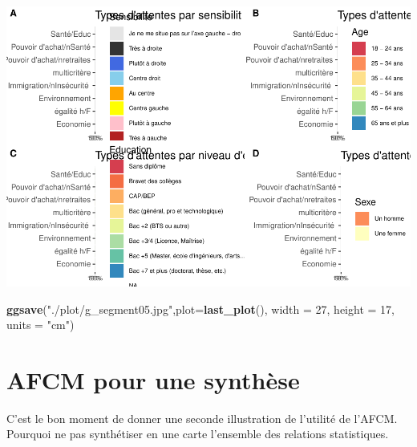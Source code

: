 \documentclass[
]{book}
\newenvironment{Shaded}{\begin{snugshade}}{\end{snugshade}}
\newcommand{\DataTypeTok}[1]{\textcolor[rgb]{0.13,0.29,0.53}{#1}}
\newcommand{\DecValTok}[1]{\textcolor[rgb]{0.00,0.00,0.81}{#1}}
\newcommand{\KeywordTok}[1]{\textcolor[rgb]{0.13,0.29,0.53}{\textbf{#1}}}
\newcommand{\NormalTok}[1]{#1}
\newcommand{\StringTok}[1]{\textcolor[rgb]{0.31,0.60,0.02}{#1}}
\begin{document}
\includegraphics{bookdown-demo_files/figure-latex/0817-1.pdf}

\begin{Shaded}
\begin{Highlighting}[]
\KeywordTok{ggsave}\NormalTok{(}\StringTok{"./plot/g_segment05.jpg"}\NormalTok{,}\DataTypeTok{plot=}\KeywordTok{last_plot}\NormalTok{(), }\DataTypeTok{width =} \DecValTok{27}\NormalTok{, }\DataTypeTok{height =} \DecValTok{17}\NormalTok{, }\DataTypeTok{units =} \StringTok{"cm"}\NormalTok{)}
\end{Highlighting}
\end{Shaded}

\hypertarget{afcm-pour-une-synthuxe8se}{%
\section{AFCM pour une synthèse}\label{afcm-pour-une-synthuxe8se}}

C'est le bon moment de donner une seconde illustration de l'utilité de l'AFCM. Pourquoi ne pas synthétiser en une carte l'ensemble des relations statistiques.
\end{document}
